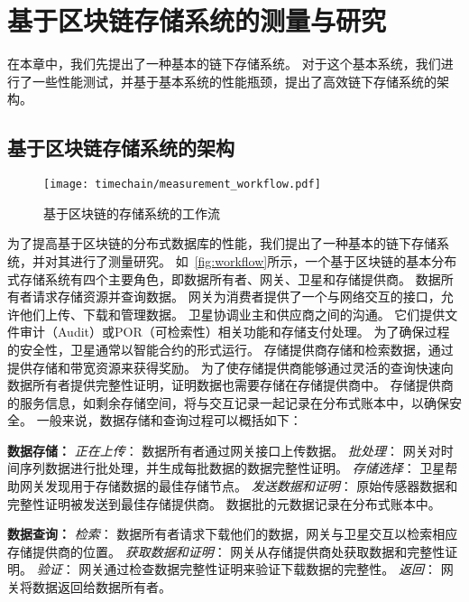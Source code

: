 \chapter{基于区块链存储系统的测量与研究}
\label{sec:baseline}
在本章中，我们先提出了一种基本的链下存储系统。
对于这个基本系统，我们进行了一些性能测试，并基于基本系统的性能瓶颈，提出了高效链下存储系统的架构。

\section{基于区块链存储系统的架构}

\begin{figure}[t]
    \centering
    \texttt{[image: timechain/measurement\_workflow.pdf]}
    \caption{基于区块链的存储系统的工作流}
    \label{fig:workflow}
\end{figure}

为了提高基于区块链的分布式数据库的性能，我们提出了一种基本的链下存储系统，并对其进行了测量研究。
如~\autoref{fig:workflow}所示，一个基于区块链的基本分布式存储系统有四个主要角色，即数据所有者、网关、卫星和存储提供商。
数据所有者请求存储资源并查询数据。
网关为消费者提供了一个与网络交互的接口，允许他们上传、下载和管理数据。
卫星协调业主和供应商之间的沟通。
它们提供文件审计（Audit）或POR（可检索性）相关功能和存储支付处理。
为了确保过程的安全性，卫星通常以智能合约的形式运行。
存储提供商存储和检索数据，通过提供存储和带宽资源来获得奖励。
为了使存储提供商能够通过灵活的查询快速向数据所有者提供完整性证明，证明数据也需要存储在存储提供商中。
存储提供商的服务信息，如剩余存储空间，将与交互记录一起记录在分布式账本中，以确保安全。
一般来说，数据存储和查询过程可以概括如下：

\textbf{数据存储：}
\textit{正在上传}：
数据所有者通过网关接口上传数据。
\textit{批处理}：
网关对时间序列数据进行批处理，并生成每批数据的数据完整性证明。
\textit{存储选择}：
卫星帮助网关发现用于存储数据的最佳存储节点。
\textit{发送数据和证明}：
原始传感器数据和完整性证明被发送到最佳存储提供商。
数据批的元数据记录在分布式账本中。

\textbf{数据查询：}
\textit{检索}：
数据所有者请求下载他们的数据，网关与卫星交互以检索相应存储提供商的位置。
\textit{获取数据和证明}：
网关从存储提供商处获取数据和完整性证明。
\textit{验证}：
网关通过检查数据完整性证明来验证下载数据的完整性。
\textit{返回}：
网关将数据返回给数据所有者。

